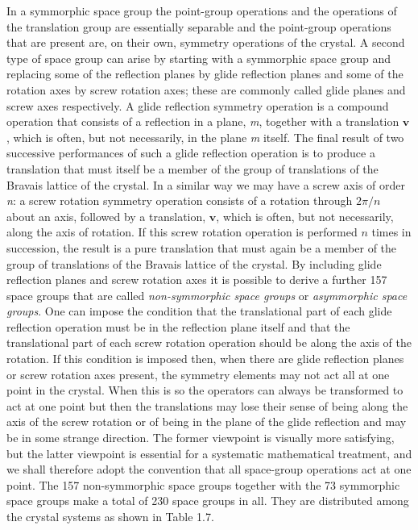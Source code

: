 \documentclass[11pt,a4paper,twoside,openright]{book}
\begin{document}
In a symmorphic space group the point-group operations and the operations of the translation group are essentially separable and the point-group operations that are present are, on their own, symmetry operations of the crystal. A second type of space group can arise by starting with a symmorphic space group and replacing some of the reflection planes by glide reflection planes and some of the rotation axes by screw rotation axes; these are commonly called glide planes and screw axes respectively. A glide reflection symmetry operation is a compound operation that consists of a reflection in a plane, \textit{m}, together with a translation $\mathbf{v}$, which is often, but not necessarily, in the plane \textit{m} itself. The final result of two successive performances of such a glide reflection operation is to produce a translation that must itself be a member of the group of translations of the Bravais lattice of the crystal. In a similar way we may have a screw axis of order \textit{n}: a screw rotation symmetry operation consists of a rotation through $2\pi/n$ about an axis, followed by a translation, $\mathbf{v}$, which is often, but not necessarily, along the axis of rotation. If this screw rotation operation is performed $n$ times in succession, the result is a pure translation that must again be a member of the group of translations of the Bravais lattice of the crystal. By including glide reflection planes and screw rotation axes it is possible to derive a further 157 space groups that are called \textit{non-symmorphic space groups} or \textit{asymmorphic space groups}. One can impose the condition that the translational part of each glide reflection operation must be in the reflection plane itself and that the translational part of each screw rotation operation should be along the axis of the rotation. If this condition is imposed then, when there are glide reflection planes or screw rotation axes present, the symmetry elements may not act all at one point in the crystal. When this is so the operators can always be transformed to act at one point but then the translations may lose their sense of being along the axis of the screw rotation or of being in the plane of the glide reflection and may be in some strange direction. The former viewpoint is visually more satisfying, but the latter viewpoint is essential for a systematic mathematical treatment, and we shall therefore adopt the convention that all space-group operations act at one point. The 157 non-symmorphic space groups together with the 73 symmorphic space groups make a total of 230 space groups in all. They are distributed among the crystal systems as shown in Table 1.7.
\end{document}
